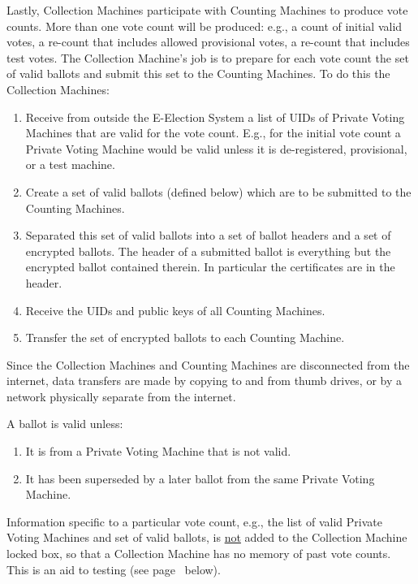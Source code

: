 \documentclass[12pt]{article}
\newcommand{\pagref}[1]{(see page~\pageref{#1} below)}
\begin{document}
Lastly, Collection Machines participate with Counting Machines to
produce vote counts.  More than one vote count will be produced:
e.g., a count of initial valid votes, a re-count that includes
allowed provisional votes, a re-count that includes test votes.
The Collection Machine's job is to prepare for each vote count
the set of valid ballots and submit this set to the Counting Machines.
To do this the Collection Machines:

\begin{enumerate}
\setcounter{enumi}{\value{CMC-COUNTER}}
\item Receive from outside the E-Election System a list of UIDs of
Private Voting Machines that are valid for the vote count.
E.g., for the initial vote count a Private Voting Machine would
be valid unless it is de-registered, provisional, or a test machine.
\item Create a set of valid ballots (defined below)
which are to be submitted to the Counting Machines.
\item Separated this set of valid ballots into a set of ballot headers
and a set of encrypted ballots.  The header of a submitted ballot is
everything but the encrypted ballot contained therein.  In particular
the certificates are in the header.
\item Receive the UIDs and public keys of all Counting Machines.
\item Transfer the set of encrypted ballots to each Counting Machine.
\end{enumerate}

Since the Collection Machines and Counting Machines
are disconnected from the internet,
data transfers are made by copying to and from thumb drives, or by
a network physically separate from the internet.

A ballot is valid unless:

\begin{enumerate}
\item It is from a Private Voting Machine that is not valid.
\item It has been superseded by a later ballot from the same
Private Voting Machine.
\end{enumerate}

Information specific to a particular vote count, e.g., the
list of valid Private Voting Machines and set of valid ballots,
is \underline{not} added to the Collection Machine locked box,
so that a Collection Machine has no memory of past vote counts.
This is an aid to testing \pagref{TESTING}.
\end{document}
